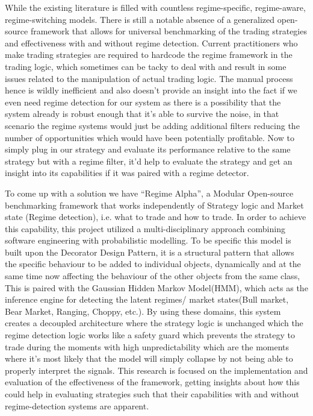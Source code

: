 \documentclass[conference]{IEEEtran}
\begin{document}
While the existing literature is filled with countless regime-specific, regime-aware, regime-switching models. There is still a notable absence of a generalized open-source framework that allows for universal benchmarking of the trading strategies and effectiveness with and without regime detection. Current practitioners who make trading strategies are required to hardcode the regime framework in the trading logic, which sometimes can be tacky to deal with and result in some issues related to the manipulation of actual trading logic. The manual process hence is wildly inefficient and also doesn't provide an insight into the fact if we even need regime detection for our system as there is a possibility that the system already is robust enough that it's able to survive the noise, in that scenario the regime systems would just be adding additional filters reducing the number of opportunities which would have been potentially profitable. Now to simply plug in our strategy and evaluate its performance relative to the same strategy but with a regime filter, it'd help to evaluate the strategy and get an insight into its capabilities if it was paired with a regime detector.

To come up with a solution we have ``Regime Alpha'', a Modular Open-source benchmarking framework that works independently of Strategy logic and Market state (Regime detection), i.e. what to trade and how to trade. In order to achieve this capability, this project utilized a multi-disciplinary approach combining software engineering with probabilistic modelling. To be specific this model is built upon the Decorator Design Pattern, it is a structural pattern that allows the specific behaviour to be added to individual objects, dynamically and at the same time now affecting the behaviour of the other objects from the same class, This is paired with the Gaussian Hidden Markov Model(HMM), which acts as the inference engine for detecting the latent regimes/ market states(Bull market, Bear Market, Ranging, Choppy, etc.). By using these domains, this system creates a decoupled architecture where the strategy logic is unchanged which the regime detection logic works like a safety guard which prevents the strategy to trade during the moments with high unpredictability which are the moments where it's most likely that the model will simply collapse by not being able to properly interpret the signals. This research is focused on the implementation and evaluation of the effectiveness of the framework, getting insights about how this could help in evaluating strategies such that their capabilities with and without regime-detection systems are apparent.
\end{document}
